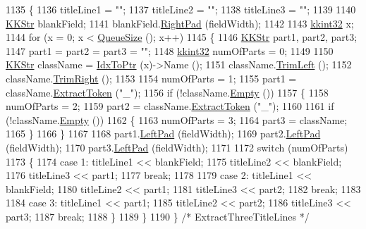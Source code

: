 \begin{DoxyCode}
1135 \{
1136   titleLine1 = \textcolor{stringliteral}{""};
1137   titleLine2 = \textcolor{stringliteral}{""};
1138   titleLine3 = \textcolor{stringliteral}{""};
1139 
1140   \hyperlink{class_k_k_b_1_1_k_k_str}{KKStr} blankField;
1141   blankField.\hyperlink{class_k_k_b_1_1_k_k_str_aab728b1075242a5728ec4a579979d519}{RightPad} (fieldWidth);
1142 
1143   \hyperlink{namespace_k_k_b_a8fa4952cc84fda1de4bec1fbdd8d5b1b}{kkint32} x;
1144   \textcolor{keywordflow}{for}  (x = 0;  x < \hyperlink{class_k_k_b_1_1_k_k_queue_a1dab601f75ee6a65d97f02bddf71c40d}{QueueSize} ();  x++)
1145   \{
1146     \hyperlink{class_k_k_b_1_1_k_k_str}{KKStr}  part1, part2, part3;
1147     part1 = part2 = part3 = \textcolor{stringliteral}{""};
1148     \hyperlink{namespace_k_k_b_a8fa4952cc84fda1de4bec1fbdd8d5b1b}{kkint32}  numOfParts = 0;
1149 
1150     \hyperlink{class_k_k_b_1_1_k_k_str}{KKStr}  className = \hyperlink{class_k_k_b_1_1_k_k_queue_acce2bdd8b3327e38266cf198382cd852}{IdxToPtr} (x)->Name ();
1151     className.\hyperlink{class_k_k_b_1_1_k_k_str_af7c102c53103ddff3f48270b4a198c89}{TrimLeft} ();
1152     className.\hyperlink{class_k_k_b_1_1_k_k_str_aa912161f17871e2d6fec7bbac033221c}{TrimRight} ();
1153     
1154     numOfParts = 1;
1155     part1 = className.\hyperlink{class_k_k_b_1_1_k_k_str_acc31c95308d6d699debde883c11e5802}{ExtractToken} (\textcolor{stringliteral}{"\_"});
1156     \textcolor{keywordflow}{if}  (!className.\hyperlink{class_k_k_b_1_1_k_k_str_ac69942f73fffd672ec2a6e1c410afdb6}{Empty} ())
1157     \{
1158       numOfParts = 2;
1159       part2 = className.\hyperlink{class_k_k_b_1_1_k_k_str_acc31c95308d6d699debde883c11e5802}{ExtractToken} (\textcolor{stringliteral}{"\_"});
1160 
1161       \textcolor{keywordflow}{if}  (!className.\hyperlink{class_k_k_b_1_1_k_k_str_ac69942f73fffd672ec2a6e1c410afdb6}{Empty} ())
1162       \{
1163         numOfParts = 3;
1164         part3 = className;
1165       \}
1166     \}
1167 
1168     part1.\hyperlink{class_k_k_b_1_1_k_k_str_a5fc76668dbfe28861b45ecebda941b7c}{LeftPad} (fieldWidth);
1169     part2.\hyperlink{class_k_k_b_1_1_k_k_str_a5fc76668dbfe28861b45ecebda941b7c}{LeftPad} (fieldWidth);
1170     part3.\hyperlink{class_k_k_b_1_1_k_k_str_a5fc76668dbfe28861b45ecebda941b7c}{LeftPad} (fieldWidth);
1171 
1172     \textcolor{keywordflow}{switch}  (numOfParts)
1173     \{
1174       \textcolor{keywordflow}{case} 1: titleLine1 << blankField;
1175               titleLine2 << blankField;
1176               titleLine3 << part1;
1177               \textcolor{keywordflow}{break};
1178 
1179       \textcolor{keywordflow}{case} 2: titleLine1 << blankField;
1180               titleLine2 << part1;
1181               titleLine3 << part2;
1182               \textcolor{keywordflow}{break};
1183 
1184       \textcolor{keywordflow}{case} 3: titleLine1 << part1;
1185               titleLine2 << part2;
1186               titleLine3 << part3;
1187               \textcolor{keywordflow}{break};
1188     \}
1189   \}
1190 \}  \textcolor{comment}{/* ExtractThreeTitleLines */}
\end{DoxyCode}
